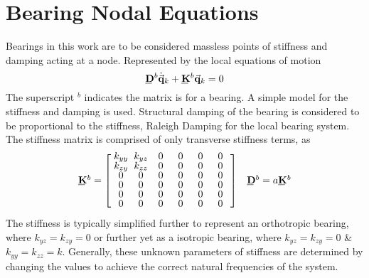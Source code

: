 \section{Bearing Nodal Equations} \label{Bearing Nodal Equations}
Bearings in this work are to be considered massless points of stiffness and damping acting at a node. Represented by the local equations of motion
\begin{equation}\label{eq:BearingNodeEquationsofMotion}
\bunderline{\mathbf{D}}^b\dot{\vec{\mathbf{q}}}_k+\bunderline{\mathbf{K}}^b\vec{\mathbf{q}}_k=0
\end{equation}
The superscript $ ^b $ indicates the matrix is for a bearing. A simple model for the stiffness and damping is used. Structural damping of the bearing is considered to be proportional to the stiffness, Raleigh Damping for the local bearing system. The stiffness matrix is comprised of only transverse stiffness terms, as 
\begin{equation}
\def\cs{2em}
\begin{array}{cc}
\bunderline{\mathbf{K}}^b=\left[\def\arraystretch{.8}\arraycolsep=0pt\begin{array}{cccccc}
\makebox[\cs]{$k_{yy}$}&\makebox[\cs]{$k_{yz}$}&\makebox[\cs]{0}&\makebox[\cs]{0}&\makebox[\cs]{0}&\makebox[\cs]{0}\\
k_{zy}&k_{zz}&0&0&0&0\\
0&0&0&0&0&0\\
0&0&0&0&0&0\\
0&0&0&0&0&0\\
0&0&0&0&0&0
\end{array}\right] & \bunderline{\mathbf{D}}^b=a\bunderline{\mathbf{K}}^b
\end{array}
\end{equation}
The stiffness is typically simplified further to represent an orthotropic bearing, where $ k_{yz}=k_{zy}=0 $ or further yet as a isotropic bearing, where $ k_{yz}=k_{zy}=0 $ \& $ k_{yy}=k_{zz}=k $. Generally, these unknown parameters of stiffness are determined by changing the values to achieve the correct natural frequencies of the system.
